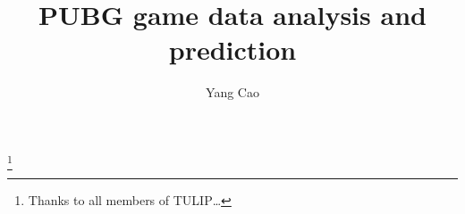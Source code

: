 \documentclass{amsart}
\begin{document}
%
%
\title[PUBG game data analysis and prediction]{PUBG game data analysis and prediction}%


\author{Yang Cao}
\address[A.~2]{School of Information Technology \\
Deakin University, Geelong, VIC 3216, Australia}%



\thanks{Thanks to all members of TULIP\ldots}%
%
\date{\gitAuthorDate}%




\maketitle
\tableofcontents

\newpage



\newpage



\listoftodos
\end{document}
